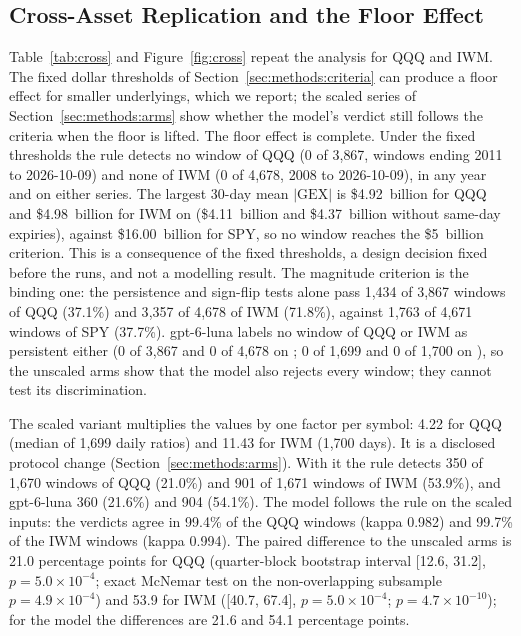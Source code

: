 \subsection{Cross-Asset Replication and the Floor Effect}
\label{sec:results:cross}

Table~\ref{tab:cross} and Figure~\ref{fig:cross} repeat the analysis for QQQ and IWM. The fixed dollar thresholds of Section~\ref{sec:methods:criteria} can produce a floor effect for smaller underlyings, which we report; the scaled series of Section~\ref{sec:methods:arms} show whether the model's verdict still follows the criteria when the floor is lifted.
The floor effect is complete. Under the fixed thresholds the rule detects no window of QQQ (0 of 3{,}867, windows ending 2011 to 2026-10-09) and none of IWM (0 of 4{,}678, 2008 to 2026-10-09), in any year and on either series. The largest 30-day mean $|\mathrm{GEX}|$ is \$4.92~billion for QQQ and \$4.98~billion for IWM on  (\$4.11~billion and \$4.37~billion without same-day expiries), against \$16.00~billion for SPY, so no window reaches the \$5~billion criterion. This is a consequence of the fixed thresholds, a design decision fixed before the runs, and not a modelling result. The magnitude criterion is the binding one: the persistence and sign-flip tests alone pass 1{,}434 of 3{,}867 windows of QQQ (37.1\%) and 3{,}357 of 4{,}678 of IWM (71.8\%), against 1{,}763 of 4{,}671 windows of SPY (37.7\%). gpt-6-luna labels no window of QQQ or IWM as persistent either (0 of 3{,}867 and 0 of 4{,}678 on ; 0 of 1{,}699 and 0 of 1{,}700 on ), so the unscaled arms show that the model also rejects every window; they cannot test its discrimination.

The scaled variant multiplies the  values by one factor per symbol: 4.22 for QQQ (median of 1{,}699 daily ratios) and 11.43 for IWM (1{,}700 days). It is a disclosed protocol change (Section~\ref{sec:methods:arms}). With it the rule detects 350 of 1{,}670 windows of QQQ (21.0\%) and 901 of 1{,}671 windows of IWM (53.9\%), and gpt-6-luna 360 (21.6\%) and 904 (54.1\%). The model follows the rule on the scaled inputs: the verdicts agree in 99.4\% of the QQQ windows (kappa 0.982) and 99.7\% of the IWM windows (kappa 0.994). The paired difference to the unscaled arms is 21.0 percentage points for QQQ (quarter-block bootstrap interval [12.6, 31.2], $p=5.0\times10^{-4}$; exact McNemar test on the non-overlapping subsample $p=4.9\times10^{-4}$) and 53.9 for IWM ([40.7, 67.4], $p=5.0\times10^{-4}$; $p=4.7\times10^{-10}$); for the model the differences are 21.6 and 54.1 percentage points.

